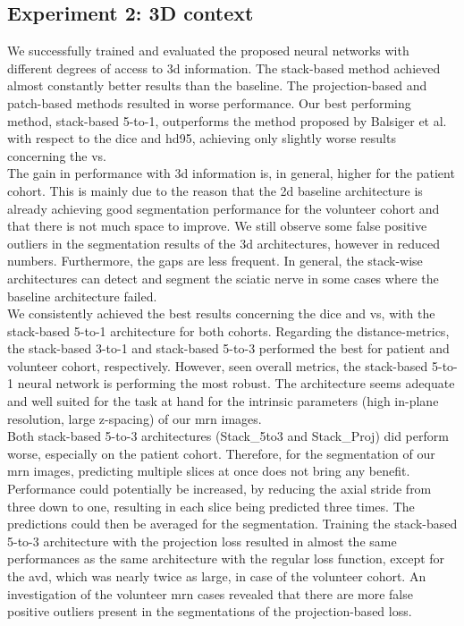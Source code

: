 \subsection{Experiment 2: 3D context}
We successfully trained and evaluated the proposed neural networks with different degrees of access to  \gls{3d} information. The stack-based method achieved almost constantly better results than the baseline. The projection-based and patch-based methods resulted in worse performance. Our best performing method, stack-based 5-to-1, outperforms the method proposed by Balsiger et al.~\cite{Balsiger2018SegmentationApproach} with respect to the \acrlong{dice} and \acrlong{hd95}, achieving only slightly worse results concerning the \acrlong{vs}.\\
The gain in performance with \gls{3d} information is, in general, higher for the patient cohort. This is mainly due to the reason that the \gls{2d} baseline architecture is already achieving good segmentation performance for the volunteer cohort and that there is not much space to improve. We still observe some false positive outliers in the segmentation results of the \gls{3d} architectures, however in reduced numbers. Furthermore, the gaps are less frequent. In general, the stack-wise architectures can detect and segment the sciatic nerve in some cases where the baseline architecture failed.\\
We consistently achieved the best results concerning the \acrlong{dice} and \acrlong{vs}, with the stack-based 5-to-1 architecture for both cohorts. Regarding the distance-metrics, the stack-based 3-to-1 and stack-based 5-to-3 performed the best for patient and volunteer cohort, respectively. However, seen overall metrics, the stack-based 5-to-1 neural network is performing the most robust. The architecture seems adequate and well suited for the task at hand for the intrinsic parameters (high in-plane resolution, large z-spacing) of our \gls{mrn} images.\\
Both stack-based 5-to-3 architectures (Stack\_5to3 and Stack\_Proj) did perform worse, especially on the patient cohort. Therefore, for the segmentation of our \gls{mrn} images, predicting multiple slices at once does not bring any benefit. Performance could potentially be increased, by reducing the axial stride from three down to one, resulting in each slice being predicted three times. The predictions could then be averaged for the segmentation.
Training the stack-based 5-to-3 architecture with the projection loss resulted in almost the same performances as the same architecture with the regular loss function, except for the \acrlong{avd}, which was nearly twice as large, in case of the volunteer cohort. An investigation of the volunteer \gls{mrn} cases revealed that there are more false positive outliers present in the segmentations of the projection-based loss.\\
